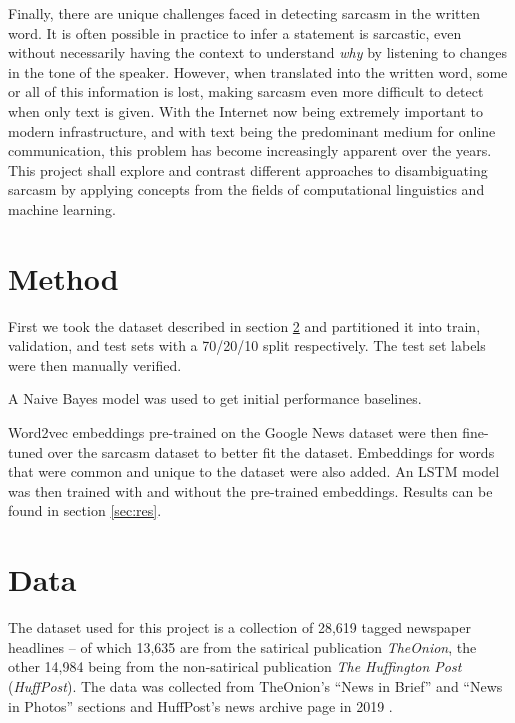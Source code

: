 \documentclass[11pt]{article}
\begin{document}
Finally, there are unique challenges faced in detecting sarcasm in the written
word. It is often possible in practice to infer a statement is sarcastic, even
without necessarily having the context to understand \textit{why} by listening
to changes in the tone of the speaker. However, when translated into the
written word, some or all of this information is lost, making sarcasm even more
difficult to detect when only text is given. With the Internet now being
extremely important to modern infrastructure, and with text being the
predominant medium for online communication, this problem has become
increasingly apparent over the years. This project shall explore and contrast
different approaches to disambiguating sarcasm by applying concepts from the
fields of computational linguistics and machine learning.

\section{Method}

First we took the dataset described in section \ref{sec:data}
and partitioned it into train, validation, and test sets with a 70/20/10 split respectively.
The test set labels were then manually verified.


A Naive Bayes model was used to get initial performance baselines.

Word2vec embeddings pre-trained on the Google News dataset
were then fine-tuned over the sarcasm dataset to better fit the dataset. \cite{google-word2vec}
Embeddings for words that were common and unique to the dataset were also added.
An LSTM model was then trained with and without the pre-trained embeddings.
Results can be found in section \ref{sec:res}.

\section{Data}\label{sec:data}

The dataset used for this project is a collection
of 28,619 tagged newspaper headlines --
of which 13,635 are from the satirical publication \textit{TheOnion},
the other 14,984 being from the non-satirical publication \textit{The Huffington Post} (\textit{HuffPost}).
The data was collected from TheOnion's ``News in Brief'' and ``News in Photos'' sections
and HuffPost's news archive page in 2019 \cite{misra2023Sarcasm}.
\end{document}
